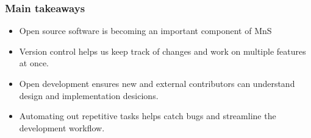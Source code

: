 \begin{frame}
    \frametitle{Main takeaways}
    \begin{itemize}
        \item Open source software is becoming an important component of \Gls{MnS}
        \item Version control helps us keep track of changes and work on multiple features at once.
        \item Open development ensures new and external contributors can understand design and implementation desicions.
        \item Automating out repetitive tasks helps catch bugs and streamline the development workflow. 
    \end{itemize}
\end{frame}
